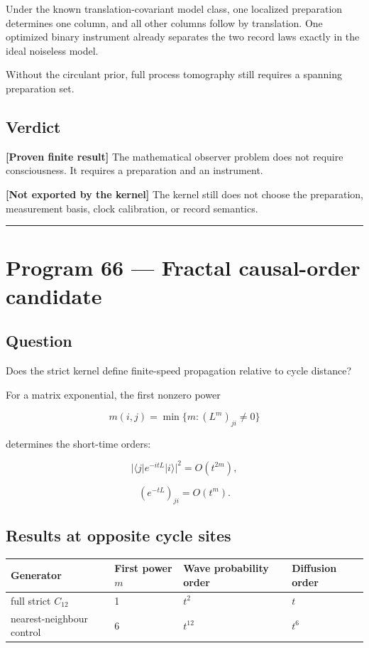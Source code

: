\documentclass[11pt,a4paper,openany]{report}
\begin{document}
Under the known translation-covariant model class, one localized preparation determines one column, and all other columns follow by translation. One optimized binary instrument already separates the two record laws exactly in the ideal noiseless model.

Without the circulant prior, full process tomography still requires a spanning preparation set.

\section{Verdict}

\textbf{[Proven finite result]} The mathematical observer problem does not require consciousness. It requires a preparation and an instrument.

\textbf{[Not exported by the kernel]} The kernel still does not choose the preparation, measurement basis, clock calibration, or record semantics.

\par\medskip\hrule\medskip

\chapter{Program 66 — Fractal causal-order candidate}

\section{Question}

Does the strict kernel define finite-speed propagation relative to cycle distance?

For a matrix exponential, the first nonzero power

\[
m(i,j)=\min\{m:(L^m)_{ji}\ne0\}
\]

determines the short-time orders:

\[
|\langle j|e^{-itL}|i\rangle|^2=O(t^{2m}),
\]

\[
(e^{-tL})_{ji}=O(t^m).
\]

\section{Results at opposite cycle sites}

\begin{center}
\begingroup\small
\setlength{\tabcolsep}{3.5pt}
\renewcommand{\arraystretch}{1.16}
\begin{longtable}{@{}p{}p{}p{}p{}@{}}
\toprule
\textbf{Generator} & \textbf{First power \(m\)} & \textbf{Wave probability order} & \textbf{Diffusion order} \\
\midrule
\endhead
full strict \(C_{12}\) & 1 & \(t^2\) & \(t\) \\
nearest-neighbour control & 6 & \(t^{12}\) & \(t^6\) \\
\bottomrule
\end{longtable}
\endgroup
\end{center}
\end{document}
